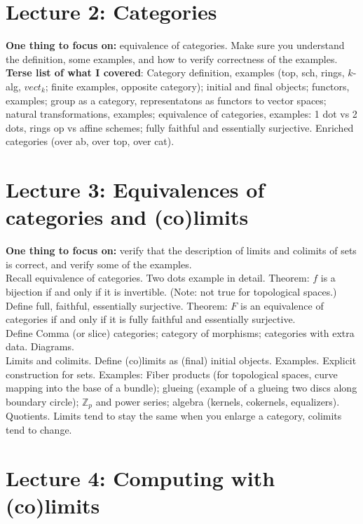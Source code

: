 \documentclass[12pt]{article}
\newcommand{\Z}{{\mathbb Z}}
\begin{document}
\newpage
\section{Lecture 2: Categories}

\textbf{One thing to focus on:} equivalence of categories. Make sure you understand the definition, some examples, and how to verify correctness of the examples.
\\

\textbf{Terse list of what I covered}: 
 Category definition, examples (top, sch, rings, $k$-alg, $vect_k$; finite examples, opposite category); initial and final objects; functors, examples; group as a category, representatons as functors to vector spaces; natural transformations, examples; equivalence of categories, examples: 1 dot vs 2 dots, rings op vs affine schemes; fully faithful and essentially surjective. Enriched categories (over ab, over top, over cat).

\newpage
\section{Lecture 3: Equivalences of categories and (co)limits}

\textbf{One thing to focus on:} verify that the description of limits and colimits of sets is correct, and verify some of the examples.
\\

Recall equivalence of categories. Two dots example in detail. Theorem: $f$ is a bijection if and only if it is invertible. (Note: not true for topological spaces.) Define full, faithful, essentially surjective. Theorem: $F$ is an equivalence of categories if and only if it is fully faithful and essentially surjective.
\\

Define Comma (or slice) categories; category of morphisms; categories with extra data. Diagrams.
\\

Limits and colimits. Define (co)limits as (final) initial objects. Examples. Explicit construction for sets. Examples: Fiber products (for topological spaces, curve mapping into the base of a bundle); glueing (example of a glueing two discs along boundary circle); $\Z_p$ and power series; algebra (kernels, cokernels, equalizers). Quotients. Limits tend to stay the same when you enlarge a category, colimits tend to change.


\newpage
\section{Lecture 4: Computing with (co)limits}
\end{document}
